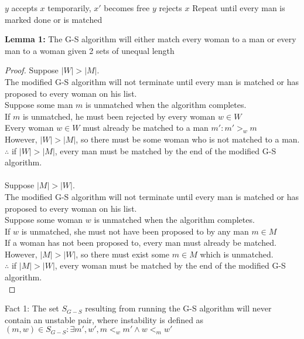 \begin{problem}
\begin{algorithmic}[1]
        \STATE $y$ accepts $x$ temporarily, $x'$ becomes free
        \ELSE
        \STATE $y$ rejects $x$
        \ENDIF
      \ENDIF
      \STATE Repeat until every man is marked done or is matched
    \end{algorithmic}
    \textbf{Lemma 1:} The G-S algorithm will either match every woman to a man or every man to a woman given 2 sets of unequal length
    \begin{proof}
      Suppose $|W| > |M|$. \\
      The modified G-S algorithm will not terminate until every man is matched or has proposed to every woman on his list. \\
      Suppose some man $m$ is unmatched when the algorithm completes. \\
      If $m$ is unmatched, he must been rejected by every woman $w \in W$ \\
      Every woman $w \in W$ must already be matched to a man $m': m' >_{w} m$ \\
      However, $|W| > |M|$, so there must be some woman who is not matched to a man. \\
      $\therefore$ if $|W| > |M|$, every man must be matched by the end of the modified G-S algorithm. \\\\
      Suppose $|M| > |W|$. \\
      The modified G-S algorithm will not terminate until every man is matched or has proposed to every woman on his list. \\
      Suppose some woman $w$ is unmatched when the algorithm completes. \\
      If $w$ is unmatched, she must not have been proposed to by any man $m \in M$ \\
      If a woman has not been proposed to, every man must already be matched. \\
      However, $|M| > |W|$, so there must exist some $m \in M$ which is unmatched. \\
      $\therefore$ if $|M| > |W|$, every woman must be matched by the end of the modified G-S algorithm. \\
    \end{proof}
    Fact 1: The set $S_{G-S}$ resulting from running the G-S algorithm will never contain an unstable pair, where instability is defined as $(m,w) \in S_{G-S} : \exists m', w', m <_{w} m' \land w <_{m} w'$ \\

\end{problem}
